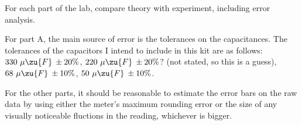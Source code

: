 \analysis

For each part of the lab, compare theory with experiment, including error analysis.

For part A, the main source of error is the tolerances on
the capacitances.
The tolerances of the capacitors I intend to include in this kit are as
follows:
$330\ \mu\zu{F}\:\pm 20\%$,
$220\ \mu\zu{F}\:\pm 20\%$? (not stated, so this is a guess),
$68\ \mu\zu{F}\:\pm 10\%$,
$50\ \mu\zu{F}\:\pm 10\%$. 

For the other parts, it should be reasonable to estimate the error bars on the raw
data by using either the meter's maximum rounding error or the size of any visually
noticeable fluctions in the reading, whichever is bigger.


